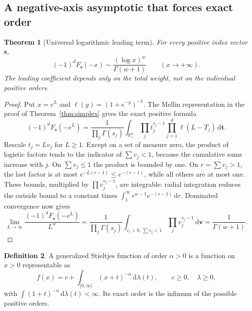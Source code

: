 \documentclass[11pt]{article}
\numberwithin{equation}{section}
\newtheorem{theorem}{Theorem}[section]
\theoremstyle{definition}
\newtheorem{definition}[theorem]{Definition}
\theoremstyle{remark}
\newcommand{\dd}{\,\mathrm d}
\newcommand{\R}{\mathbb R}
\newcommand{\sv}{\boldsymbol s}
\newcommand{\tv}{\boldsymbol t}
\begin{document}
\subsection{A negative-axis asymptotic that forces exact order}
\begin{theorem}[Universal logarithmic leading term]\label{thm:negativeasymptotic}
For every positive index vector $\sv$,
\begin{equation}\label{eq:negativeasymptotic}
 (-1)^dF_{\sv}(-x)\sim\frac{(\log x)^w}{\Gamma(w+1)}
 \qquad(x\to+\infty).
\end{equation}
The leading coefficient depends only on the total weight, not on the
individual positive orders.
\end{theorem}
\begin{proof}
Put $x=e^L$ and $\ell(y)=(1+e^{-y})^{-1}$. The Mellin representation
in the proof of Theorem~\ref{thm:simplex} gives the exact positive formula
\begin{equation}\label{eq:logistic}
 (-1)^dF_{\sv}(-e^L)
 =\frac1{\prod_j\Gamma(s_j)}\int_{\R_+^d}
       \prod_j t_j^{s_j-1}\prod_{j=1}^d\ell(L-T_j)\dd\tv.
\end{equation}
Rescale $t_j=Lv_j$ for $L\ge1$. Except on a set of measure zero, the
product of logistic factors tends to the indicator of $\sum v_j<1$,
because the cumulative sums increase with $j$.
On $\sum v_j\le1$ the product is bounded by one. On $r=\sum v_j>1$,
the last factor is at most $e^{-L(r-1)}\le e^{-(r-1)}$, while all
others are at most one. These bounds, multiplied by
$\prod v_j^{s_j-1}$, are integrable: radial integration reduces the
outside bound to a constant times $\int_1^\infty r^{w-1}e^{-(r-1)}\dd r$.
Dominated convergence now gives
\[
 \lim_{L\to\infty}\frac{(-1)^dF_{\sv}(-e^L)}{L^w}
 =\frac1{\prod_j\Gamma(s_j)}
   \int_{v_j>0,\,\sum v_j<1}\prod_jv_j^{s_j-1}\dd\boldsymbol v
 =\frac1{\Gamma(w+1)}.
\]
\end{proof}

\begin{definition}
A generalized Stieltjes function of order $\alpha>0$ is a function
on $x>0$ representable as
\[
 f(x)=c+\int_{[0,\infty)}(x+t)^{-\alpha}\dd\lambda(t),
 \qquad c\ge0,\quad\lambda\ge0,
\]
with $\int(1+t)^{-\alpha}\dd\lambda(t)<\infty$.
Its exact order is the infimum of the possible positive orders.
\end{definition}
\end{document}
